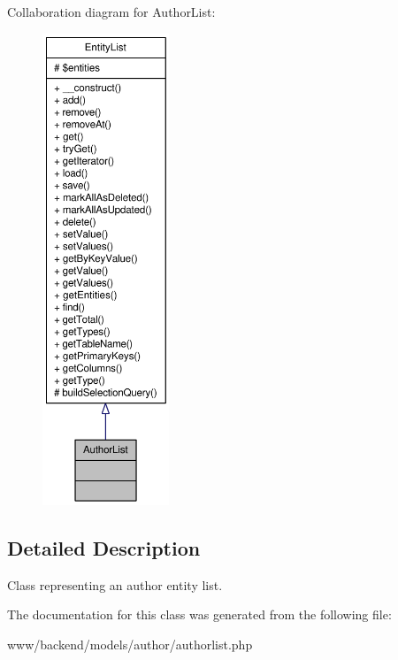 Collaboration diagram for AuthorList:\nopagebreak
\begin{figure}[H]
\begin{center}
\leavevmode
\includegraphics[height=400pt]{classAuthorList__coll__graph}
\end{center}
\end{figure}


\subsection{Detailed Description}
Class representing an author entity list. 

The documentation for this class was generated from the following file:\begin{DoxyCompactItemize}
\item 
www/backend/models/author/authorlist.php\end{DoxyCompactItemize}
